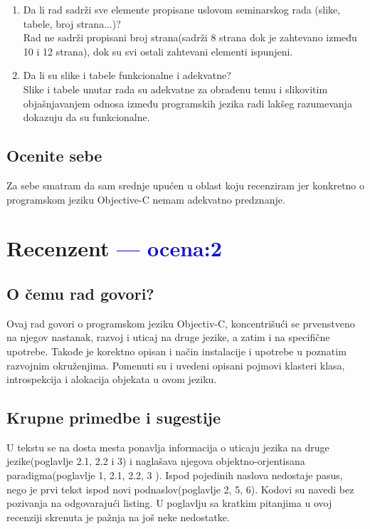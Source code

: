 \documentclass[a4paper]{report}
\newcommand{\odgovor}[1]{\textcolor{blue}{#1}}
\begin{document}
\begin{enumerate}
\item Da li rad sadrži sve elemente propisane uslovom seminarskog rada (slike, tabele, broj strana...)?\\
Rad ne sadrži propisani broj strana(sadrži 8 strana dok je zahtevano između 10 i 12 strana), dok su svi ostali zahtevani elementi ispunjeni.

\item Da li su slike i tabele funkcionalne i adekvatne?\\
Slike i tabele unutar rada su adekvatne za obrađenu temu i slikovitim objašnjavanjem odnosa između programskih jezika radi lakšeg razumevanja dokazuju da su funkcionalne.
\end{enumerate}

\section{Ocenite sebe}
Za sebe smatram da sam srednje upućen u oblast koju recenziram jer konkretno o programskom jeziku Objective-C nemam adekvatno predznanje.

\chapter{Recenzent \odgovor{--- ocena:2} }


\section{O čemu rad govori?}
Ovaj rad govori o programskom jeziku Objectiv-C, koncentrišući se prvenstveno na njegov nastanak, razvoj i uticaj na druge jezike, a zatim i na specifične upotrebe. Takođe je korektno opisan i način instalacije i upotrebe u poznatim razvojnim okruženjima. Pomenuti su i uvedeni opisani pojmovi klasteri klasa, introspekcija i alokacija objekata u ovom jeziku.
\section{Krupne primedbe i sugestije}
U tekstu se na dosta mesta ponavlja informacija o uticaju jezika na druge jezike(poglavlje 2.1, 2.2 i 3) i naglašava njegova objektno-orjentisana paradigma(poglavlje 1, 2.1, 2.2, 3 ). Ispod pojedinih naslova nedostaje pasus, nego je prvi tekst ispod novi podnaslov(poglavlje 2, 5, 6).  Kodovi su navedi bez pozivanja na odgovarajući listing. U poglavlju sa kratkim pitanjima u ovoj recenziji skrenuta je pažnja na još neke nedostatke.
\end{document}
